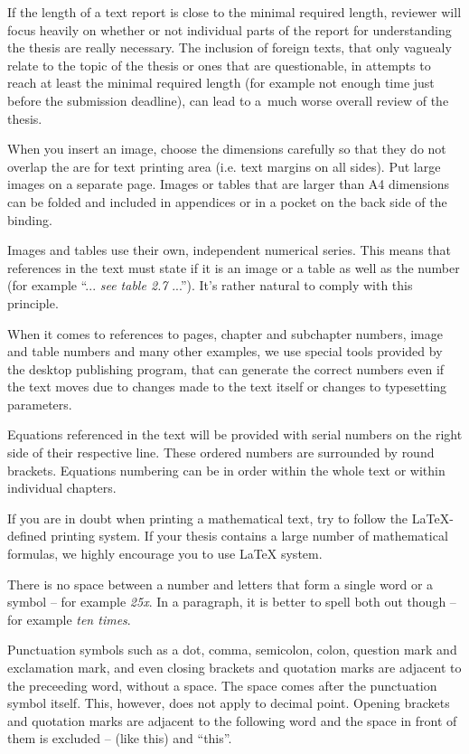 {{If the length of a text report is close to the minimal required length, reviewer will focus heavily on whether or not individual parts of the report for understanding the thesis are really necessary. The inclusion of foreign texts, that only vaguealy relate to the topic of the thesis or ones that are questionable, in attempts to reach at least the minimal required length (for example not enough time just before the submission deadline), can lead to a~much worse overall review of the thesis.

When you insert an image, choose the dimensions carefully so that they do not overlap the are for text printing area (i.e. text margins on all sides). Put large images on a separate page. Images or tables that are larger than A4 dimensions can be folded and included in appendices or in a pocket on the back side of the binding.

Images and tables use their own, independent numerical series. This means that references in the text must state if it is an image or a table as well as the number (for example ``... {\it see table 2.7} ...''). It's rather natural to comply with this principle.

When it comes to references to pages, chapter and subchapter numbers, image and table numbers and many other examples, we use special tools provided by the desktop publishing program, that can generate the correct numbers even if the text moves due to changes made to the text itself or changes to typesetting parameters.

Equations referenced in the text will be provided with serial numbers on the right side of their respective line. These ordered numbers are surrounded by round brackets. Equations numbering can be in order within the whole text or within individual chapters.

If you are in doubt when printing a mathematical text, try to follow the LaTeX-defined printing system. If your thesis contains a large number of mathematical formulas, we highly encourage you to use LaTeX system.

There is no space between a number and letters that form a single word or a symbol -- for example {\it 25x}. In a paragraph, it is better to spell both out though -- for example {\it ten times}.

Punctuation symbols such as a dot, comma, semicolon, colon, question mark and exclamation mark, and even closing brackets and quotation marks are adjacent to the preceeding word, without a space. The space comes after the punctuation symbol itself. This, however, does not apply to decimal point. Opening brackets and quotation marks are adjacent to the following word and the space in front of them is excluded -- (like this) and ``this''.

}}
